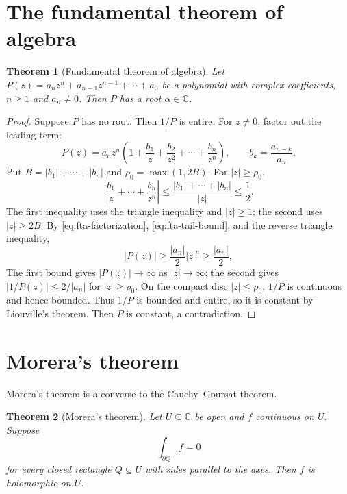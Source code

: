 \documentclass[11pt]{article}
\theoremstyle{plain}
\newtheorem{theorem}{Theorem}[section]
\theoremstyle{definition}
\theoremstyle{boldremark}
\theoremstyle{remark}
\numberwithin{equation}{section}
\newcommand{\C}{\mathbb{C}}
\begin{document}
\section{The fundamental theorem of algebra}
\begin{theorem}[Fundamental theorem of algebra]\label{thm:fta}
Let $P(z)=a_nz^n+a_{n-1}z^{n-1}+\cdots+a_0$ be a polynomial with complex
coefficients, $n\geq1$ and $a_n\ne0$. Then $P$ has a root $\alpha\in\C$.
\end{theorem}
\begin{proof}
Suppose $P$ has no root. Then $1/P$ is entire. For $z\ne0$, factor out
the leading term:
\begin{equation}\label{eq:fta-factorization}
 P(z)=a_nz^n\left(1+\frac{b_1}{z}+\frac{b_2}{z^2}+\cdots+\frac{b_n}{z^n}\right),
 \qquad b_k=\frac{a_{n-k}}{a_n}.
\end{equation}
Put $B=|b_1|+\cdots+|b_n|$ and $\rho_0=\max(1,2B)$. For $|z|\geq\rho_0$,
\begin{equation}\label{eq:fta-tail-bound}
 \left|\frac{b_1}{z}+\cdots+\frac{b_n}{z^n}\right|
 \leq\frac{|b_1|+\cdots+|b_n|}{|z|}\leq\frac12.
\end{equation}
The first inequality uses the triangle inequality and $|z|\geq1$;
the second uses $|z|\geq2B$. By \eqref{eq:fta-factorization},
\eqref{eq:fta-tail-bound}, and the reverse triangle inequality,
\begin{equation}\label{eq:fta-polynomial-bound}
 |P(z)|\geq\frac{|a_n|}{2}|z|^n\geq\frac{|a_n|}{2},
\end{equation}
The first bound gives $|P(z)|\to\infty$ as $|z|\to\infty$; the second gives
$|1/P(z)|\leq2/|a_n|$ for $|z|\geq\rho_0$. On the compact disc
$|z|\leq\rho_0$, $1/P$ is continuous and hence bounded. Thus $1/P$ is
bounded and entire, so it is constant by Liouville's theorem. Then $P$
is constant, a contradiction.
\end{proof}

\section{Morera's theorem}
Morera's theorem is a converse to the Cauchy--Goursat theorem.

\begin{theorem}[Morera's theorem]\label{thm:morera}
Let $U\subseteq\C$ be open and $f$ continuous on $U$. Suppose
\[
 \int_{\partial Q}f=0
\]
for every closed rectangle $Q\subseteq U$ with sides parallel to the
axes. Then $f$ is holomorphic on $U$.
\end{theorem}
\end{document}
